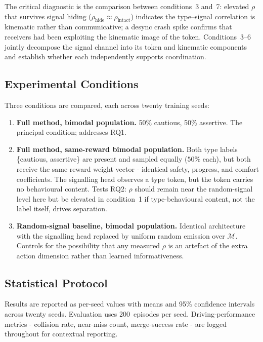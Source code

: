 \documentclass[12pt,a4paper]{article}
\begin{document}
The critical diagnostic is the comparison between conditions~3 and~7: elevated $\rho$ that
survives signal hiding ($\rho_\text{hide} \approx \rho_\text{intact}$) indicates the
type--signal correlation is kinematic rather than communicative; a desync crash spike confirms
that receivers had been exploiting the kinematic image of the token. Conditions~3--6 jointly
decompose the signal channel into its token and kinematic components and establish whether each
independently supports coordination.

\subsection{Experimental Conditions}
\label{sec:conditions}

Three conditions are compared, each across twenty training seeds:
\begin{enumerate}
    \item \textbf{Full method, bimodal population.} 50\% cautious, 50\% assertive. The
    principal condition; addresses RQ1.

    \item \textbf{Full method, same-reward bimodal population.} Both type labels \{cautious,
    assertive\} are present and sampled equally ($50\%$ each), but both receive the same reward
    weight vector - identical safety, progress, and comfort coefficients. The signalling head
    observes a type token, but the token carries no behavioural content. Tests RQ2: $\rho$ should
    remain near the random-signal level here but be elevated in condition~1 if type-behavioural
    content, not the label itself, drives separation.

    \item \textbf{Random-signal baseline, bimodal population.} Identical architecture with the
    signalling head replaced by uniform random emission over $\mathcal{M}$. Controls for the
    possibility that any measured $\rho$ is an artefact of the extra action dimension rather than
    learned informativeness.
\end{enumerate}

\subsection{Statistical Protocol}

Results are reported as per-seed values with means and 95\% confidence intervals across twenty seeds. Evaluation
uses 200~episodes per seed. Driving-performance metrics - collision rate, near-miss count,
merge-success rate - are logged throughout for contextual reporting.
\end{document}
